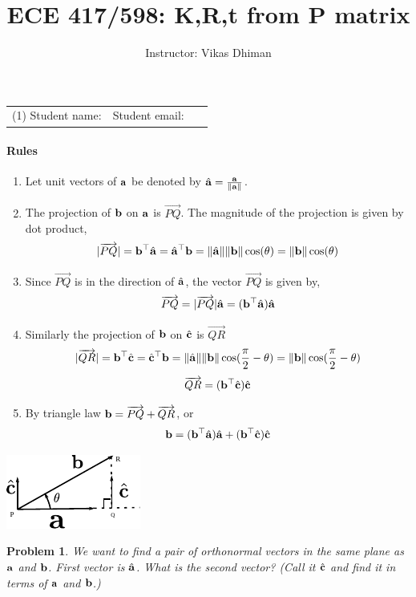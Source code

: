 \documentclass[times,singlecolumn]{article}
\title{ECE 417/598: K,R,t from P matrix}
\author{Instructor: Vikas Dhiman}
\newtheorem{prob}{Problem}
\begin{document}
\maketitle
\begin{tabular}{p{0.5\linewidth}p{0.5\linewidth}}
  (1) Student name:& Student email: \\
\end{tabular}

\paragraph{Rules}
\begin{enumerate}
\item Let unit vectors of $\mathbf{a}$ be denoted by $\hat{\mathbf{a}} = \frac{\mathbf{a}}{\|\mathbf{a}\|}$.
\item The projection of $\mathbf{b}$ on $\mathbf{a}$ is $\overrightarrow{PQ}$. The
  magnitude of the projection is given by dot product,
  \[ |\overrightarrow{PQ}| = \mathbf{b}^\top \hat{\mathbf{a}} = \hat{\mathbf{a}}^\top \mathbf{b} =
    \|\hat{\mathbf{a}}\|\|\mathbf{b}\|\cos(\theta) =  \|\mathbf{b}\|\cos(\theta)\]
  \item Since $\overrightarrow{PQ}$ is in the direction of $\hat{\mathbf{a}}$, the
    vector $\overrightarrow{PQ}$ is given by,
    \[
      \overrightarrow{PQ} = |\overrightarrow{PQ}| \hat{\mathbf{a}}
      = ( \mathbf{b}^\top \hat{\mathbf{a}}) \hat{\mathbf{a}}
    \]
\item Similarly the projection of $\mathbf{b}$ on $\hat{\mathbf{c}}$  is $\overrightarrow{QR}$
  \[ |\overrightarrow{QR}| = \mathbf{b}^\top \hat{\mathbf{c}} = \hat{\mathbf{c}}^\top \mathbf{b} =
    \|\hat{\mathbf{a}}\|\|\mathbf{b}\|\cos(\frac{\pi}{2} - \theta) =  \|\mathbf{b}\|\cos(\frac{\pi}{2} - \theta)\]
  \[ \overrightarrow{QR} = (\mathbf{b}^\top \hat{\mathbf{c}})  \hat{\mathbf{c}} \]
\item By triangle law $\mathbf{b} = \overrightarrow{PQ} + \overrightarrow{QR}$,
  or
  \[
    \mathbf{b} = (\mathbf{b}^\top \hat{\mathbf{a}}) \hat{\mathbf{a}} + (\mathbf{b}^\top \hat{\mathbf{c}})\hat{\mathbf{c}}
  \]

\end{enumerate}

\hfill\includegraphics[width=0.25\linewidth]{media/triangle-law-projection.pdf}

\begin{prob}
\item We want to find a pair of orthonormal vectors in the same plane as $\mathbf{a}$ and $\mathbf{b}$.
  First vector is $\hat{\mathbf{a}}$. What is the second vector? (Call it $\hat{\mathbf{c}}$
  and find it in terms of $\mathbf{a}$ and $\mathbf{b}$.)
    
\end{prob}
\end{document}
